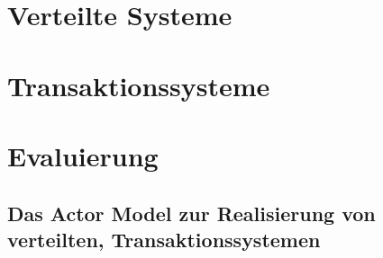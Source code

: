 
\chapter{Verteilte Systeme}
\chapter{Transaktionssysteme}
\chapter{Evaluierung}
\section{Das Actor Model zur Realisierung von verteilten, Transaktionssystemen} 